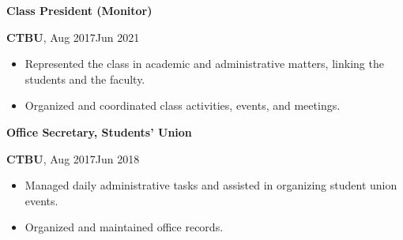 \documentclass[a4paper,20pt]{article}
\begin{document}
\begin{minipage}{.4\linewidth} \begin{flushleft}
    		\textbf{Class President (Monitor)}
    	\end{flushleft} \end{minipage}
    \hfill
    \begin{minipage}{.5\linewidth}\begin{flushright}
    	\textbf{CTBU}, Aug 2017\textemdash Jun 2021
    \end{flushright}\end{minipage}
    \begin{itemize}
    \centering
    \justifying
	\item{Represented the class in academic and administrative matters, linking the students and the faculty.}
    \vspace{-5pt}
   	\item{Organized and coordinated class activities, events, and meetings.}
    \end{itemize}
    
\begin{minipage}{.4\linewidth} \begin{flushleft}
\textbf{Office Secretary, Students' Union}
    	\end{flushleft} \end{minipage}
    \hfill
    \begin{minipage}{.5\linewidth}\begin{flushright}
    	\textbf{CTBU}, Aug 2017\textemdash Jun 2018
    \end{flushright}\end{minipage}
    \begin{itemize}
    \centering
    \justifying
	\item{Managed daily administrative tasks and assisted in organizing student union events.}
    \vspace{-5pt}
   	\item{Organized and maintained office records.}
    \end{itemize}
\end{document}
